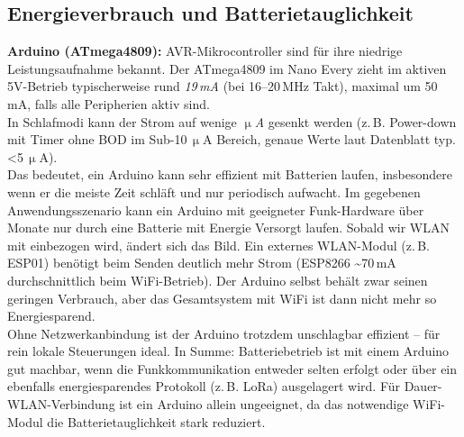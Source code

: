 \subsection{Energieverbrauch und Batterietauglichkeit}


\vspace{5mm}

\noindent\textbf{Arduino (ATmega4809):} AVR-Mikrocontroller sind für ihre niedrige Leistungsaufnahme bekannt. Der ATmega4809 im Nano Every zieht im aktiven 5V-Betrieb typischerweise rund \textit{19\,mA} \autocite{esp32_comparison} (bei 16–20\,MHz Takt), maximal um 50\,mA, falls alle Peripherien aktiv sind. 
\\
In Schlafmodi kann der Strom auf wenige \textit{$\upmu$A} gesenkt werden (z.\,B. Power-down mit Timer ohne BOD im Sub-10\,$\upmu$A Bereich, genaue Werte laut Datenblatt typ. <5\,$\upmu$A). \autocite{atmega_datasheet} 
\\
Das bedeutet, ein Arduino kann sehr effizient mit Batterien laufen, insbesondere wenn er die meiste Zeit schläft und nur periodisch aufwacht. Im gegebenen Anwendungsszenario kann ein Arduino mit geeigneter Funk-Hardware über Monate nur durch eine Batterie mit Energie Versorgt laufen. Sobald wir WLAN mit einbezogen wird, ändert sich das Bild. Ein externes WLAN-Modul (z.\,B. ESP01) benötigt beim Senden deutlich mehr Strom (ESP8266 \textasciitilde70\,mA durchschnittlich beim WiFi-Betrieb). Der Arduino selbst behält zwar seinen geringen Verbrauch, aber das Gesamtsystem mit WiFi ist dann nicht mehr so Energiesparend. 
\\
Ohne Netzwerkanbindung ist der Arduino trotzdem unschlagbar effizient – für rein lokale Steuerungen ideal. In Summe: Batteriebetrieb ist mit einem Arduino gut machbar, wenn die Funkkommunikation entweder selten erfolgt oder über ein ebenfalls energiesparendes Protokoll (z.\,B. LoRa) ausgelagert wird. Für Dauer-WLAN-Verbindung ist ein Arduino allein ungeeignet, da das notwendige WiFi-Modul die Batterietauglichkeit stark reduziert.


\vspace{5mm}

